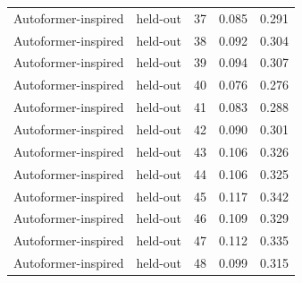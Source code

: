 \begin{tabular}{llrrr}
Autoformer-inspired & held-out & 37 & 0.085 & 0.291 \\
Autoformer-inspired & held-out & 38 & 0.092 & 0.304 \\
Autoformer-inspired & held-out & 39 & 0.094 & 0.307 \\
Autoformer-inspired & held-out & 40 & 0.076 & 0.276 \\
Autoformer-inspired & held-out & 41 & 0.083 & 0.288 \\
Autoformer-inspired & held-out & 42 & 0.090 & 0.301 \\
Autoformer-inspired & held-out & 43 & 0.106 & 0.326 \\
Autoformer-inspired & held-out & 44 & 0.106 & 0.325 \\
Autoformer-inspired & held-out & 45 & 0.117 & 0.342 \\
Autoformer-inspired & held-out & 46 & 0.109 & 0.329 \\
Autoformer-inspired & held-out & 47 & 0.112 & 0.335 \\
Autoformer-inspired & held-out & 48 & 0.099 & 0.315 \\
\bottomrule
\end{tabular}
